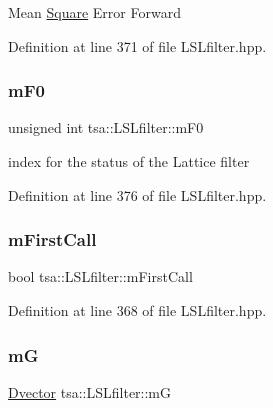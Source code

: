 Mean \hyperlink{classtsa_1_1_square}{Square} Error Forward 

Definition at line 371 of file L\+S\+Lfilter.\+hpp.

\mbox{\label{classtsa_1_1_l_s_lfilter_a490187ff893b2ff71a5f36f9b4efe7f3}} 
\subsubsection{\texorpdfstring{m\+F0}{mF0}}
{\footnotesize\ttfamily unsigned int tsa\+::\+L\+S\+Lfilter\+::m\+F0\hspace{0.3cm}{\ttfamily [private]}}

index for the status of the Lattice filter 

Definition at line 376 of file L\+S\+Lfilter.\+hpp.

\mbox{\label{classtsa_1_1_l_s_lfilter_a23612cc3cfdb9a0dfb38743f54e4d076}} 
\subsubsection{\texorpdfstring{m\+First\+Call}{mFirstCall}}
{\footnotesize\ttfamily bool tsa\+::\+L\+S\+Lfilter\+::m\+First\+Call\hspace{0.3cm}{\ttfamily [private]}}



Definition at line 368 of file L\+S\+Lfilter.\+hpp.

\mbox{\label{classtsa_1_1_l_s_lfilter_a0a2ad9e25528879045483500ff6401b0}} 
\subsubsection{\texorpdfstring{mG}{mG}}
{\footnotesize\ttfamily \hyperlink{namespacetsa_a8900fb03d849baf447a1a0efe2561fb2}{Dvector} tsa\+::\+L\+S\+Lfilter\+::mG\hspace{0.3cm}{\ttfamily [private]}}

